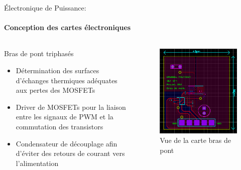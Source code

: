 \documentclass{beamer}
\begin{document}
	\begin{frame}{Électronique de Puissance:}
		\framesubtitle{Conception des cartes électroniques}
		\begin{columns}[T]
	  		\begin{column}{0.6\textwidth}
	  			Bras de pont triphasés
		    	\begin{itemize}
		    		\item Détermination des surfaces d'échanges thermiques adéquates aux pertes des MOSFETs
		    		\item Driver de MOSFETs pour la liaison entre les signaux de PWM et la commutation des transistors
		    		\item Condensateur de découplage afin d'éviter des retours de courant vers l'alimentation
		    	\end{itemize}
	  		\end{column}
	  		\begin{column}{0.4\textwidth}
	  			\begin{figure}
	  				\begin{center}
	  					\includegraphics[height=0.5\textheight]{../Illus/PCB_Bras_de_pont.PNG}
	  				\end{center}
	    			\caption{Vue de la carte bras de pont}
	    		\end{figure}
	  		\end{column}
		\end{columns}
	\end{frame}
	
\end{document}
